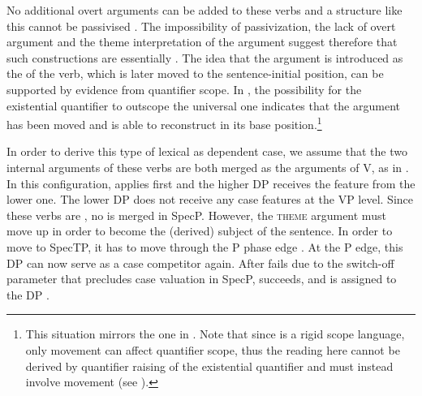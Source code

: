 \documentclass[output=paper,modfonts,newtxmath,hidelinks]{langscibook}
\begin{document}
\noindent No additional overt  arguments can be added to these verbs and a structure like this cannot be passivised . The impossibility of passivization, the lack of overt  argument and the theme interpretation of the \nomm{} argument suggest therefore that such constructions are essentially . The idea that the \nomm{} argument is introduced as the  of the verb, which is later moved to the sentence-initial position, can be supported by evidence from quantifier scope. In , the possibility for the existential quantifier to outscope the universal one indicates that the  \nomm{} argument has been moved and is able to reconstruct in its base position.\footnote{This situation mirrors the one in . Note that since  is a rigid scope language, only movement can affect quantifier scope, thus the reading here cannot be derived by quantifier raising of the existential quantifier and must instead involve movement (see \citealt{antonyk15}).}

\label{16:ex34}
\z

\label{16:ex35}
\z

\noindent In order to derive this type of lexical  as dependent case, we assume that the two internal arguments of these verbs are both merged as the arguments of V, as in . In this configuration, \down{} applies first and the higher DP receives the \lr{} feature from the lower one. The lower DP does not receive any case features at the VP level. Since these verbs are , no  is merged in Spec\littlev{}P. However, the \textsc{theme} argument must move up in order to become the (derived) subject of the sentence. In order to move to SpecTP, it has to move through the \littlev{}P phase edge \citep{legate03}. At the \littlev{}P edge, this DP can now serve as a case competitor again. After \down{} fails due to the  switch-off parameter that precludes case valuation in Spec\littlev{}P, \up{} succeeds, and \hr{} is assigned to the \datt{} DP .
	
\end{document}
